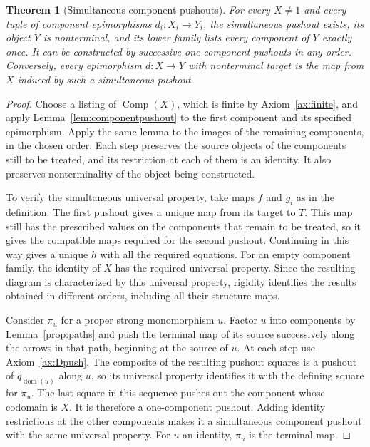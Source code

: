 \documentclass[11pt,a4paper]{article}
\theoremstyle{plain}
\newtheorem{theorem}{Theorem}[section]
\theoremstyle{definition}
\theoremstyle{remark}
\newcommand{\one}{1}
\newcommand{\dom}{\operatorname{dom}}
\newcommand{\Comp}{\operatorname{Comp}}
\begin{document}
\begin{theorem}[Simultaneous component pushouts]\label{thm:componentpushouts}
For every $X\ne\one$ and every tuple of component epimorphisms
$d_i:X_i\to Y_i$, the simultaneous pushout exists, its object $Y$ is nonterminal,
and its lower family lists every component of $Y$ exactly once.
It can be constructed by successive one-component pushouts in any
order. Conversely, every epimorphism $d:X\to Y$ with nonterminal target is the map
from $X$ induced by such a simultaneous pushout.
\end{theorem}
\begin{proof}
Choose a listing of $\Comp(X)$, which is finite by
Axiom~\ref{ax:finite}, and apply Lemma~\ref{lem:componentpushout}
to the first component and its specified epimorphism. Apply the same
lemma to the images of the remaining components, in the chosen
order. Each step preserves the source objects of the components
still to be treated, and its restriction at each of them is an
identity. It also preserves nonterminality of the object being
constructed.

To verify the simultaneous universal property, take maps $f$ and
$g_i$ as in the definition. The first pushout gives a unique map
from its target to $T$. This map still has the prescribed values
on the components that remain to be treated, so it gives the
compatible maps required for the second pushout. Continuing in
this way gives a unique $h$ with all the required equations.
For an empty component family, the identity of $X$ has the
required universal property. Since the resulting diagram is
characterized by this universal property, rigidity identifies
the results obtained in different orders, including all their
structure maps.

Consider $\pi_u$ for a proper strong monomorphism $u$.
Factor $u$ into components by Lemma~\ref{prop:paths} and push
the terminal map of its source successively along the arrows in
that path, beginning at the source of $u$. At each step use
Axiom~\ref{ax:Dpush}. The composite of the resulting pushout squares
is a pushout of $q_{\dom(u)}$ along $u$, so its universal property
identifies it with the defining square for $\pi_u$.
The last square in this sequence pushes out the component whose
codomain is $X$. It is therefore a one-component pushout. Adding
identity restrictions at the other components makes it a simultaneous
component pushout with the same universal property.
For $u$ an identity, $\pi_u$ is the terminal map.


\end{proof}
\end{document}
